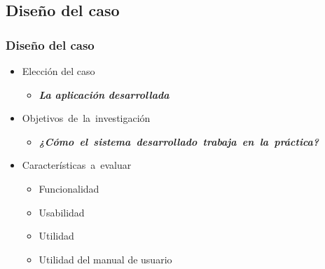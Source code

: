 \documentclass[9pt]{beamer}
\begin{document}
    \subsection{Diseño del caso}
    \begin{frame}
        \frametitle{Diseño del caso}                       
        
        \begin{itemize}
            \item Elección del caso
            \begin{itemize}
                \item \textbf{\textit{La aplicación desarrollada}}
            \end{itemize}

            \item Objetivos de la investigación
            \begin{itemize}
                \item \textbf{\textit{¿Cómo el sistema desarrollado trabaja en la práctica?}}
            \end{itemize}

            \item Características a evaluar
            \begin{itemize}
                \item Funcionalidad
                \item Usabilidad
                \item Utilidad
                \item Utilidad del manual de usuario
            \end{itemize}
        \end{itemize}

    \end{frame}
\end{document}
